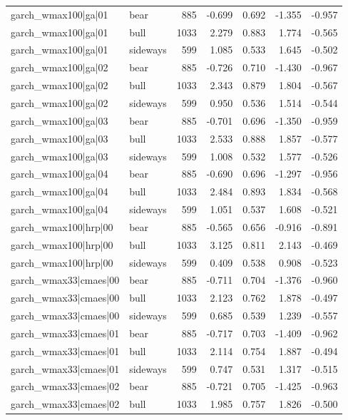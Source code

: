 \begin{table}
\begin{tabular}{llrrrrr}
garch\_wmax100|ga|01 & bear & 885 & -0.699 & 0.692 & -1.355 & -0.957 \\
garch\_wmax100|ga|01 & bull & 1033 & 2.279 & 0.883 & 1.774 & -0.565 \\
garch\_wmax100|ga|01 & sideways & 599 & 1.085 & 0.533 & 1.645 & -0.502 \\
garch\_wmax100|ga|02 & bear & 885 & -0.726 & 0.710 & -1.430 & -0.967 \\
garch\_wmax100|ga|02 & bull & 1033 & 2.343 & 0.879 & 1.804 & -0.567 \\
garch\_wmax100|ga|02 & sideways & 599 & 0.950 & 0.536 & 1.514 & -0.544 \\
garch\_wmax100|ga|03 & bear & 885 & -0.701 & 0.696 & -1.350 & -0.959 \\
garch\_wmax100|ga|03 & bull & 1033 & 2.533 & 0.888 & 1.857 & -0.577 \\
garch\_wmax100|ga|03 & sideways & 599 & 1.008 & 0.532 & 1.577 & -0.526 \\
garch\_wmax100|ga|04 & bear & 885 & -0.690 & 0.696 & -1.297 & -0.956 \\
garch\_wmax100|ga|04 & bull & 1033 & 2.484 & 0.893 & 1.834 & -0.568 \\
garch\_wmax100|ga|04 & sideways & 599 & 1.051 & 0.537 & 1.608 & -0.521 \\
garch\_wmax100|hrp|00 & bear & 885 & -0.565 & 0.656 & -0.916 & -0.891 \\
garch\_wmax100|hrp|00 & bull & 1033 & 3.125 & 0.811 & 2.143 & -0.469 \\
garch\_wmax100|hrp|00 & sideways & 599 & 0.409 & 0.538 & 0.908 & -0.523 \\
garch\_wmax33|cmaes|00 & bear & 885 & -0.711 & 0.704 & -1.376 & -0.960 \\
garch\_wmax33|cmaes|00 & bull & 1033 & 2.123 & 0.762 & 1.878 & -0.497 \\
garch\_wmax33|cmaes|00 & sideways & 599 & 0.685 & 0.539 & 1.239 & -0.557 \\
garch\_wmax33|cmaes|01 & bear & 885 & -0.717 & 0.703 & -1.409 & -0.962 \\
garch\_wmax33|cmaes|01 & bull & 1033 & 2.114 & 0.754 & 1.887 & -0.494 \\
garch\_wmax33|cmaes|01 & sideways & 599 & 0.747 & 0.531 & 1.317 & -0.515 \\
garch\_wmax33|cmaes|02 & bear & 885 & -0.721 & 0.705 & -1.425 & -0.963 \\
garch\_wmax33|cmaes|02 & bull & 1033 & 1.985 & 0.757 & 1.826 & -0.500 \\

\end{tabular}
\end{table}
